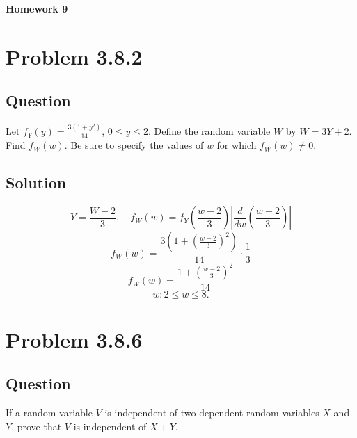 \documentclass[12pt]{article}
\begin{document}
\begin{center}
  \Large \textbf{Homework 9}
\end{center}

\section*{Problem 3.8.2}
\subsection*{Question}
Let \(f_Y(y) = \frac{3(1+y^2)}{14}\), \(0 \leq y \leq 2\). Define the random variable \(W\) by \(W = 3Y + 2\). Find \(f_W(w)\). Be sure to specify the values of \(w\) for which \(f_W(w) \neq 0\).

\subsection*{Solution}
\[
  Y = \frac{W - 2}{3}, \quad f_W(w) = f_Y\left(\frac{w-2}{3}\right) \left| \frac{d}{dw}\left(\frac{w-2}{3}\right) \right|
\]
\[
  f_W(w) = \frac{3\left(1 + \left(\frac{w-2}{3}\right)^2\right)}{14} \cdot \frac{1}{3}
\]
\[
  f_W(w) = \frac{1 + \left(\frac{w-2}{3}\right)^2}{14}
\]
\[
  w: 2 \leq w \leq 8.
\]
\pagebreak


\section*{Problem 3.8.6}
\subsection*{Question}
If a random variable \(V\) is independent of two dependent random variables \(X\) and \(Y\), prove that \(V\) is independent of \(X + Y\).
\end{document}
